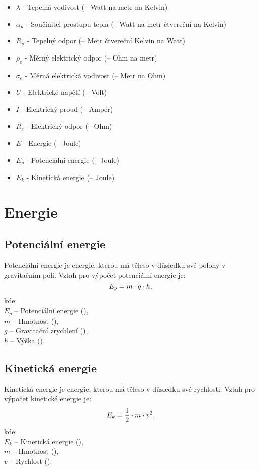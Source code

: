 \documentclass{article}
\begin{document}
\begin{itemize}
    \item $\lambda$ - Tepelná vodivost (\ueqWandMinvKinv \myFS -- Watt na metr na Kelvin)
    \item $\alpha_{\vartheta}$ - Součinitel prostupu tepla (\ueqWandMinvsqKinv \myFS -- Watt na metr čtvereční na Kelvin)
    \item $R_{\vartheta}$ - Tepelný odpor (\ueqMsqKandWinv \myFS -- Metr čtvereční Kelvin na Watt)
    \item $\rho_e$ - Měrný elektrický odpor (\ueqOHMandMinv \myFS -- Ohm na metr)
    \item $\sigma_e$ - Měrná elektrická vodivost (\ueqMandOHMinv \myFS -- Metr na Ohm)
    \item $U$ - Elektrické napětí (\ueqV \myFS -- Volt)
    \item $I$ - Elektrický proud (\ueqA \myFS -- Ampér)
    \item $R_e$ - Elektrický odpor (\ueqOHM \myFS -- Ohm)
    \item $E$ - Energie (\ueqJ \myFS -- Joule)
    \item $E_p$ - Potenciální energie (\ueqJ \myFS -- Joule)
    \item $E_k$ - Kinetická energie (\ueqJ \myFS -- Joule)
\end{itemize}

\newpage




\section{Energie}



\subsection{Potenciální energie}
Potenciální energie je energie, kterou má těleso v důsledku své polohy v gravitačním poli. Vztah pro výpočet potenciální energie je:
\begin{equation}
    E_p = m \cdot g \cdot h,
    \tagaddtext{(\ueqJ)}
\end{equation}
kde:\\
$E_p$ -- Potenciální energie (\ueqJ),\\
$m$ -- Hmotnost (\ueqKG),\\
$g$ -- Gravitační zrychlení (\ueqMandSinvsq),\\
$h$ -- Výška (\ueqM).



\subsection{Kinetická energie}
Kinetická energie je energie, kterou má těleso v důsledku své rychlosti. Vztah pro výpočet kinetické energie je:
\begin{equation}
    E_k = \frac{1}{2} \cdot m \cdot v^2,
    \tagaddtext{(\ueqJ)}
\end{equation}
kde:\\
$E_k$ -- Kinetická energie (\ueqJ),\\
$m$ -- Hmotnost (\ueqKG),\\
$v$ -- Rychlost (\ueqMandSinv).
\end{document}
